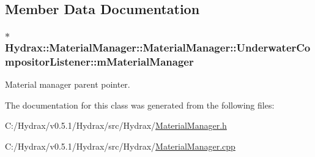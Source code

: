\subsection{Member Data Documentation}
\hypertarget{class_hydrax_1_1_material_manager_1_1_underwater_compositor_listener_94ecea85a85083939a0dae2ed04035f1}{
\subsubsection[{mMaterialManager}]{$\ast$ Hydrax::MaterialManager::MaterialManager::UnderwaterCompositorListener::mMaterialManager}}
\label{class_hydrax_1_1_material_manager_1_1_underwater_compositor_listener_94ecea85a85083939a0dae2ed04035f1}


Material manager parent pointer. 



The documentation for this class was generated from the following files:\begin{CompactItemize}
\item 
C:/Hydrax/v0.5.1/Hydrax/src/Hydrax/\hyperlink{_material_manager_8h}{MaterialManager.h}\item 
C:/Hydrax/v0.5.1/Hydrax/src/Hydrax/\hyperlink{_material_manager_8cpp}{MaterialManager.cpp}\end{CompactItemize}
